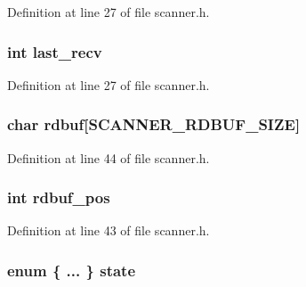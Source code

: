 Definition at line 27 of file scanner.\+h.

\subsubsection[{\texorpdfstring{last\+\_\+recv}{last_recv}}]{\setlength{\rightskip}{0pt plus 5cm}int last\+\_\+recv}\hypertarget{structscanner__connection_ad127e56d0e8e42d9e183c7779015c25a}{}\label{structscanner__connection_ad127e56d0e8e42d9e183c7779015c25a}


Definition at line 27 of file scanner.\+h.

\subsubsection[{\texorpdfstring{rdbuf}{rdbuf}}]{\setlength{\rightskip}{0pt plus 5cm}char rdbuf\mbox{[}{\bf S\+C\+A\+N\+N\+E\+R\+\_\+\+R\+D\+B\+U\+F\+\_\+\+S\+I\+ZE}\mbox{]}}\hypertarget{structscanner__connection_ab80770ee6fdc6ba2112df048b1d555f2}{}\label{structscanner__connection_ab80770ee6fdc6ba2112df048b1d555f2}


Definition at line 44 of file scanner.\+h.

\subsubsection[{\texorpdfstring{rdbuf\+\_\+pos}{rdbuf_pos}}]{\setlength{\rightskip}{0pt plus 5cm}int rdbuf\+\_\+pos}\hypertarget{structscanner__connection_abd4c86054fbe97fb3b12d233da01798d}{}\label{structscanner__connection_abd4c86054fbe97fb3b12d233da01798d}


Definition at line 43 of file scanner.\+h.

\subsubsection[{\texorpdfstring{state}{state}}]{\setlength{\rightskip}{0pt plus 5cm}enum \{ ... \}   state}\hypertarget{structscanner__connection_a139c1a21e3b186670166bd86fd15bbf6}{}\label{structscanner__connection_a139c1a21e3b186670166bd86fd15bbf6}
